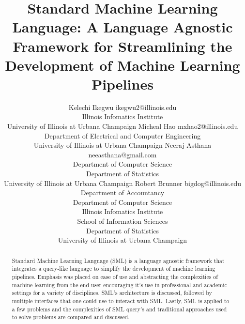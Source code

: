 \documentclass[jair,twoside,11pt,theapa]{article}
\begin{document}
\title{Standard Machine Learning Language: A Language Agnostic Framework for Streamlining the Development of Machine Learning Pipelines}

\author{\name Kelechi Ikegwu \email ikegwu2@illinois.edu \\
       \addr Illinois Infomatics Institute \\ University of Illinois at Urbana Champaign
       \AND
       \name Micheal Hao  \email mxhao2@illinois.edu \\
       \addr Department of Electrical and Computer Engineering \\ University of Illinois at Urbana Champaign
       \AND
       \name Neeraj Asthana \email neeasthana@gmail.com \\
       \addr Department of Computer Science \\ Department of Statistics \\ University of Illinois at Urbana Champaign 
       \AND
       \name Robert Brunner \email bigdog@illinois.edu\\
       \addr Department of Accountancy \\  Department of Computer Science \\ Illinois Infomatics Institute \\  School of Information Sciences \\ Department of Statistics \\  University of Illinois at Urbana Champaign}


\maketitle


\begin{abstract}
Standard Machine Learning Language (SML) is a language agnostic framework that integrates a query-like language to simplify the development of machine learning pipelines. Emphasis was placed on ease of use and abstracting the complexities of machine learning from the end user encouraging it's use in professional and academic settings for a variety of disciplines. SML's architecture is discussed, followed by multiple interfaces that one could use to interact with SML. Lastly, SML is applied to a few problems and the  complexities of SML query's and traditional approaches used to solve problems are compared and discussed.
\end{abstract}
\end{document}
